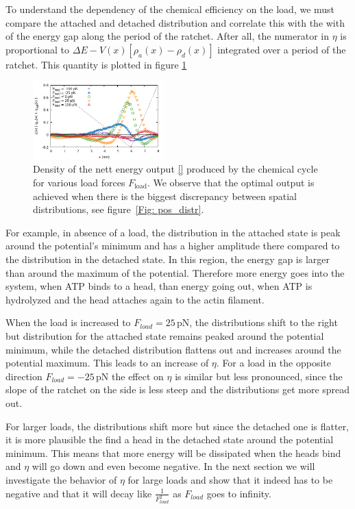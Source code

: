 \documentclass[aps,pre,twocolumn,showpacs,showkeys]{revtex4-1}
\begin{document}
To understand the dependency of the chemical efficiency on the load, we must compare the attached and detached distribution and correlate this with the with of the energy gap along the period of the ratchet. 
After all, the numerator in $\eta$ is proportional to $\Delta E - V(x) \left[ \rho_a(x) - \rho_d(x) \right]$ integrated over a period of the ratchet. 
This quantity is plotted in figure \ref{Fig: chem_energy_distr}
\begin{figure}[b]
\centering
\includegraphics[width=0.45\textwidth,height=!]{chem_energy_distr_all_F}
\caption{Density of the nett energy output \eqref{} produced by the chemical cycle for various load forces $F_\text{load}$. %
We observe that the optimal output is achieved when there is the biggest discrepancy between spatial distributions, see figure~\ref{Fig: pos_distr}. 
}
\label{Fig: chem_energy_distr}
\end{figure}


For example, in absence of a load, the distribution in the attached state is peak around the potential's minimum and has a higher amplitude there compared to the distribution in the detached state. 
In this region, the energy gap is larger than around the maximum of the potential. 
Therefore more energy goes into the system, when ATP binds to a head, than energy going out, when ATP is hydrolyzed and the head attaches again to the actin filament. 


When the load is increased to $F_{load} = 25 \, \mathrm{pN}$, the distributions shift to the right but distribution for the attached state remains peaked around the potential minimum, while the detached distribution flattens out and increases around the potential maximum. 
This leads to an increase of $\eta$. 
For a load in the opposite direction $F_{load}= -25 \, \mathrm{pN}$ the effect on $\eta$ is similar but less pronounced, since the slope of the ratchet on the side is less steep and the distributions get more spread out. 


For larger loads, the distributions shift more but since the detached one is flatter, it is more plausible the find a head in the detached state around the potential minimum. 
This means that more energy will be dissipated when the heads bind and $\eta$ will go down and even become negative. 
In the next section we will investigate the behavior of $\eta$ for large loads and show that it indeed has to be negative and that it will decay like $\frac{1}{F_{load}^2}$ as $F_{load}$ goes to infinity.
\end{document}

